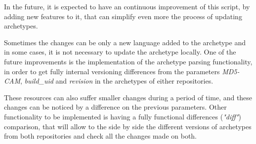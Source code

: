 \documentclass[mim_thesis.tex]{subfiles}
\begin{document}
In the future, it is expected to have an continuous improvement of this script, by adding new features to it, that can simplify even more the process of updating archetypes. 

Sometimes the changes can be only a new language added to the archetype and in some cases, it is not necessary to update the archetype locally. One of the future improvements is the implementation of the archetype parsing functionality, in order to get fully internal versioning differences from the parameters \textit{MD5-CAM}, \textit{build\_uid} and \textit{revision} in the archetypes of either repositories. 

These resources can also suffer smaller changes during a period of time, and these changes can be noticed by a difference on the previous parameters. Other functionality to be implemented is having a fully functional differences (\textit{"diff"}) comparison, that will allow to the side by side the different versions of archetypes from both repositories and check all the changes made on both. 
\end{document}
